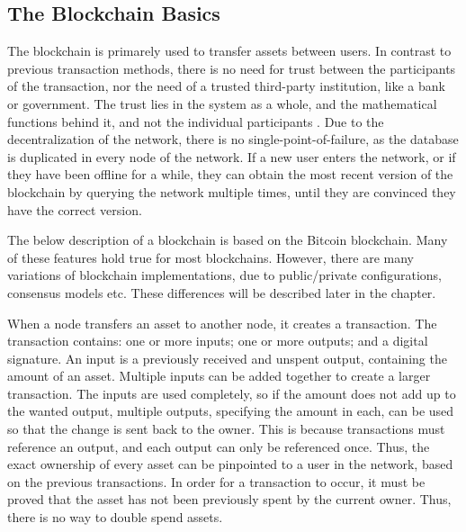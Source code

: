 \subsection{The Blockchain Basics}
The blockchain is primarely used to transfer assets between users. In contrast to previous transaction methods, there is no need for trust between the participants of the transaction, nor the need of a trusted third-party institution, like a bank or government. The trust lies in the system as a whole, and the mathematical functions behind it, and not the individual participants \cite{Nofer}. Due to the decentralization of the network, there is no single-point-of-failure, as the database is duplicated in every node of the network. If a new user enters the network, or if they have been offline for a while, they can obtain the most recent version of the blockchain by querying the network multiple times, until they are convinced they have the correct version. %

The below description of a blockchain is based on the Bitcoin blockchain. Many of these features hold true for most blockchains. However, there are many variations of blockchain implementations, due to public/private configurations, consensus models etc. These differences will be described later in the chapter.

When a node transfers an asset to another node, it creates a transaction. The transaction contains: one or more inputs; one or more outputs; and a digital signature. An input is a previously received and unspent output, containing the amount of an asset. Multiple inputs can be added together to create a larger transaction. The inputs are used completely, so if the amount does not add up to the wanted output, multiple outputs, specifying the amount in each, can be used so that the change is sent back to the owner. This is because transactions must reference an output, and each output can only be referenced once. Thus, the exact ownership of every asset can be pinpointed to a user in the network, based on the previous transactions. In order for a transaction to occur, it must be proved that the asset has not been previously spent by the current owner. Thus, there is no way to double spend assets. %

